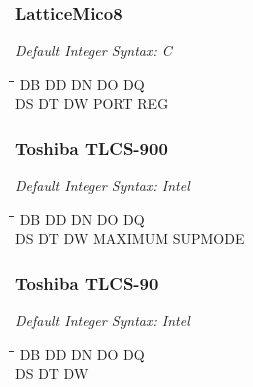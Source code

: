\subsubsection{LatticeMico8}

{\em Default Integer Syntax: C}

{\tt\begin{tabbing}
\hspace{3cm}\=\hspace{3cm}\=\hspace{3cm}\=\hspace{3cm}\=\kill
DB         \> DD          \> DN         \> DO          \> DQ \\
DS         \> DT          \> DW         \> PORT        \> REG \\
\end{tabbing}}

\subsubsection{Toshiba TLCS-900}

{\em Default Integer Syntax: Intel}

{\tt\begin{tabbing}
\hspace{3cm}\=\hspace{3cm}\=\hspace{3cm}\=\hspace{3cm}\=\kill
DB         \> DD          \> DN         \> DO          \> DQ \\
DS         \> DT          \> DW         \> MAXIMUM     \> SUPMODE \\
\end{tabbing}}

\subsubsection{Toshiba TLCS-90}

{\em Default Integer Syntax: Intel}

{\tt\begin{tabbing}
\hspace{3cm}\=\hspace{3cm}\=\hspace{3cm}\=\hspace{3cm}\=\kill
DB         \> DD          \> DN         \> DO          \> DQ \\
DS         \> DT          \> DW \\
\end{tabbing}}


